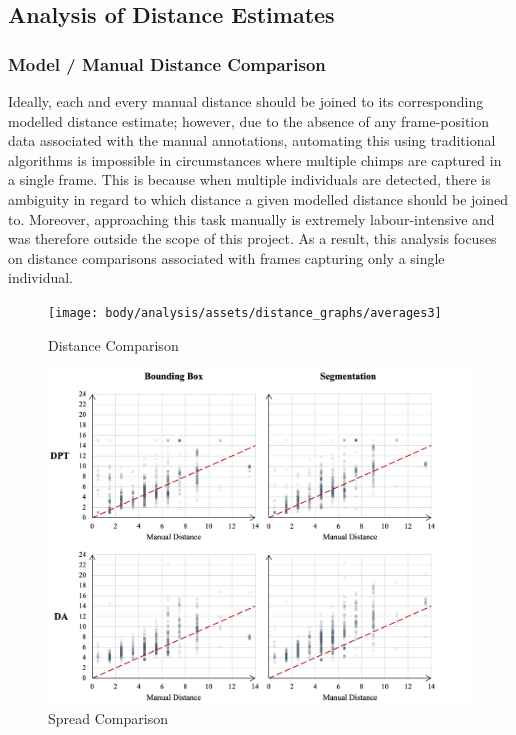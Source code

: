 \subsection{Analysis of Distance Estimates}

\subsubsection{Model / Manual Distance Comparison}\label{subsubsec:distance_comparison}

Ideally, each and every manual distance should be joined to its corresponding modelled
distance estimate; however, due to the absence of any frame-position data associated
with the manual annotations, automating this using traditional algorithms is impossible
in circumstances where multiple chimps are captured in a single frame.
This is because when multiple individuals are detected, there is ambiguity in regard to
which distance a given modelled distance should be joined to.
Moreover, approaching this task manually is extremely labour-intensive and was therefore
outside the scope of this project.
As a result, this analysis focuses on distance comparisons associated with frames capturing
only a single individual.

\begin{figure}[htbp]
    \centering
    \vspace{1cm}
    \texttt{[image: body/analysis/assets/distance\_graphs/averages3]}
    \caption{Distance Comparison}
    \label{fig:distance_comparison}
\end{figure}

\clearpage

\begin{figure}[htbp]
    \centering
    \includegraphics[width=1.01\textwidth]{body/analysis/assets/distance_graphs/spread}
    \caption{Spread Comparison}
    \label{fig:spread_comparison}
\end{figure}

